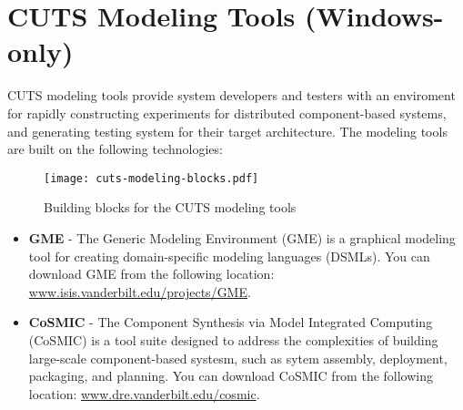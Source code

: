 \iffalse
\subsection{Installing database schemas}

To use the database features of CUTS, you must first install the CUTS database 
schemas on your MySQL server. We strongly recommend that you use MySQL 5.0 or 
greater. The installation scripts for the database schemas are at the following 
location: \texttt{\$(CUTS\_ROOT)/etc/SQL}. When installing the schemas use a 
command similar to the following:
\begin{lstlisting}
(*@\texttt{\%> mysql --user=root [--password=PASSWORD] < CUTS-create.sql}@*)
\end{lstlisting}
The CUTS database script named \texttt{CUTS-create.sql} has to be the first SQL 
script installed into the database. If you install any of the other scripts before
\texttt{CUTS-create.sql}, then you will not be able to properly install the CUTS 
database. After you install the \texttt{CUTS-create.sql}, you can install any of 
the other scripts in \texttt{\$(CUTS\_ROOT)/etc/SQL}. The table below lists the
different scripts you can install. We, however, recommend you install all the 
database schemas for completeness.
\fi

\section{CUTS Modeling Tools (Windows-only)}

CUTS modeling tools provide system developers and testers with an enviroment
for rapidly constructing experiments for distributed component-based systems,
and generating testing system for their target architecture. The modeling
tools are built on the following technologies:
\begin{figure}[htbp]
  \centering
  \texttt{[image: cuts-modeling-blocks.pdf]}
  \caption{Building blocks for the CUTS modeling tools}
  \label{fig:cuts-modeling-blocks}
\end{figure}

\begin{itemize}
  \item \textbf{GME} - The Generic Modeling Environment (GME) is a graphical
  modeling tool for creating domain-specific modeling languages (DSMLs). You
  can download GME from the following location: \url{www.isis.vanderbilt.edu/projects/GME}.

  \item \textbf{CoSMIC} - The Component Synthesis via Model Integrated 
  Computing (CoSMIC) is a tool suite designed to address the complexities of
  building large-scale component-based systesm, such as sytem assembly, 
  deployment, packaging, and planning. You can download CoSMIC from the following
  location: \url{www.dre.vanderbilt.edu/cosmic}.
\end{itemize}

